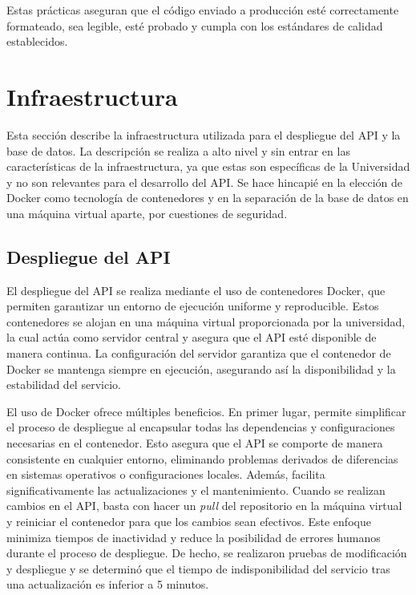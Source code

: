 Estas prácticas aseguran que el código enviado a producción esté correctamente formateado, sea legible, esté probado y cumpla con los estándares de calidad establecidos.

\section{Infraestructura}

Esta sección describe la infraestructura utilizada para el despliegue del \gls{API} y la base de datos. La descripción se realiza a alto nivel y sin entrar en las características de la infraestructura, ya que estas son específicas de la Universidad y no son relevantes para el desarrollo del \gls{API}. Se hace hincapié en la elección de \gls{Docker} como tecnología de contenedores y en la separación de la base de datos en una máquina virtual aparte, por cuestiones de seguridad.

\subsection{Despliegue del API}
\label{sec:despliegue_api}

El despliegue del \gls{API} se realiza mediante el uso de contenedores \gls{Docker}, que permiten garantizar un entorno de ejecución uniforme y reproducible. Estos contenedores se alojan en una máquina virtual proporcionada por la universidad, la cual actúa como servidor central y asegura que el \gls{API} esté disponible de manera continua. La configuración del servidor garantiza que el contenedor de \gls{Docker} se mantenga siempre en ejecución, asegurando así la disponibilidad y la estabilidad del servicio.

El uso de \gls{Docker} ofrece múltiples beneficios. En primer lugar, permite simplificar el proceso de despliegue al encapsular todas las dependencias y configuraciones necesarias en el contenedor. Esto asegura que el \gls{API} se comporte de manera consistente en cualquier entorno, eliminando problemas derivados de diferencias en sistemas operativos o configuraciones locales. Además, facilita significativamente las actualizaciones y el mantenimiento. Cuando se realizan cambios en el \gls{API}, basta con hacer un \textit{pull} del repositorio en la máquina virtual y reiniciar el contenedor para que los cambios sean efectivos. Este enfoque minimiza tiempos de inactividad y reduce la posibilidad de errores humanos durante el proceso de despliegue. De hecho, se realizaron pruebas de modificación y despliegue y se determinó que el tiempo de indisponibilidad del servicio tras una actualización es inferior a 5 minutos.

